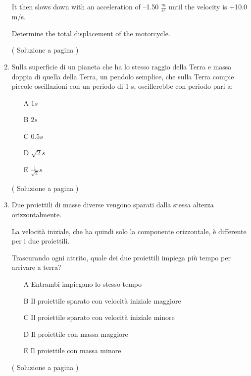 \begin{enumerate}
It then slows down with an acceleration of –1.50 $\frac{m}{s^2}$ until the velocity is +10.0 m/s.

Determine the total displacement of the motorcycle.


( Soluzione a pagina \pageref{sol_f_5} )



\item 
\label{ex_f_6} 

Sulla superficie di un pianeta che ha lo stesso raggio della Terra e massa doppia di quella della Terra, un pendolo semplice, che sulla Terra compie piccole oscillazioni con un periodo di 1 s, oscillerebbe con periodo pari a:
\begin{itemize}
\item[A] $1 s$
\item[B] $2 s$
\item[C] $0.5 s$
\item[D] $\sqrt{2} s$
\item[E] $\frac{1}{\sqrt{2}} s$
\end{itemize}


( Soluzione a pagina \pageref{sol_f_6} )


\item 
\label{ex_f_7} 
Due proiettili di masse diverse vengono sparati dalla stessa altezza orizzontalmente.

La velocità iniziale, che ha quindi solo la componente orizzontale, è differente per i
due proiettili.

Trascurando ogni attrito, quale dei due proiettili impiega più tempo per arrivare a terra?

\begin{itemize}
\item[A] Entrambi impiegano lo stesso tempo
\item[B] Il proiettile sparato con velocità iniziale maggiore
\item[C] Il proiettile sparato con velocità iniziale minore
\item[D] Il proiettile con massa maggiore
\item[E] Il proiettile con massa minore
\end{itemize}



( Soluzione a pagina \pageref{sol_f_7} )

% 
% 






\end{enumerate}



